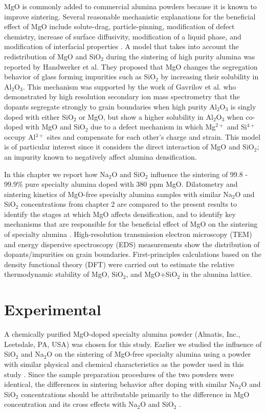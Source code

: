 MgO is commonly added to commercial alumina powders because it is known to improve sintering. Several reasonable mechanistic explanations for the beneficial effect of MgO include solute-drag, particle-pinning, modification of defect chemistry, increase of surface diffusivity, modification of a liquid phase, and modification of interfacial properties \cite{Bae1994}. A model that takes into account the redistribution of MgO and SiO$_{2}$ during the sintering of high purity alumina was reported by Handwerker et al. \cite{Handwerker1989} They proposed that MgO changes the segregation behavior of glass forming impurities such as SiO$_{2}$ by increasing their solubility in Al$_{2}$O$_{3}$. This mechanism was supported by the work of Gavrilov et al. \cite{Gavrilov1999} who demonstrated by high resolution secondary ion mass spectrometry that the dopants segregate strongly to grain boundaries when high purity Al$_{2}$O$_{3}$ is singly doped with either SiO$_{2}$ or MgO, but show a higher solubility in Al$_{2}$O$_{3}$ when co-doped with MgO and SiO$_{2}$ due to a defect mechanism in which Mg$^{2+}$ and Si$^{4+}$ occupy Al$^{3+}$ sites and compensate for each other's charge and strain. This model is of particular interest since it considers the direct interaction of MgO and SiO$_{2}$; an impurity known to negatively affect alumina densification. 

In this chapter we report how Na$_{2}$O and SiO$_{2}$ influence the sintering of 99.8 - 99.9\% pure specialty alumina doped with 380 ppm MgO. Dilatometry and sintering kinetics of MgO-free specialty alumina samples with similar Na$_{2}$O and SiO$_{2}$ concentrations from chapter 2 are compared to the present results to identify the stages at which MgO affects densification, and to identify key mechanisms that are responsible for the beneficial effect of MgO on the sintering of specialty alumina \cite{Frueh2016}. High-resolution transmission electron microscopy (TEM) and energy dispersive spectroscopy (EDS) measurements show the distribution of dopants/impurities on grain boundaries. First-principles calculations based on the density functional theory (DFT) were carried out to estimate the relative thermodynamic stability of MgO, SiO$_{2}$, and MgO+SiO$_{2}$ in the alumina lattice.


\section{Experimental}

A chemically purified MgO-doped specialty alumina powder (Almatis, Inc., Leetsdale, PA, USA) was chosen for this study. Earlier we studied the influence of SiO$_{2}$ and Na$_{2}$O on the sintering of MgO-free specialty alumina using a powder with similar physical and chemical characteristics as the powder used in this study \cite{Frueh2016}. Since the sample preparation procedures of the two powders were identical, the differences in sintering behavior after doping with similar Na$_{2}$O and SiO$_{2}$ concentrations should be attributable primarily to the difference in MgO concentration and its cross effects with Na$_{2}$O and SiO$_{2}$ \cite{Frueh2016}. 

